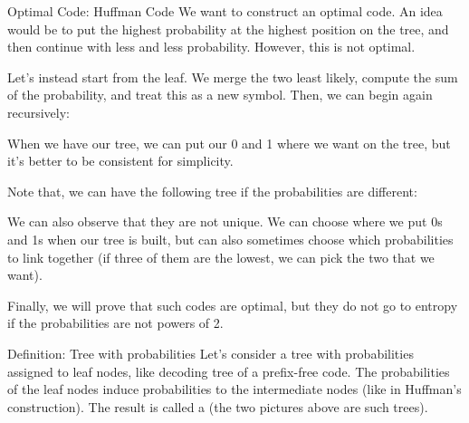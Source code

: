 \documentclass[a4paper]{article}
\begin{document}
\begin{parag}{Optimal Code: Huffman Code}
    We want to construct an optimal code. An idea would be to put the highest probability at the highest position on the tree, and then continue with less and less probability. However, this is not optimal.

    Let's instead start from the leaf. We merge the two least likely, compute the sum of the probability, and treat this as a new symbol. Then, we can begin again recursively:

    When we have our tree, we can put our 0 and 1 where we want on the tree, but it's better to be consistent for simplicity.

    Note that, we can have the following tree if the probabilities are different:

    We can also observe that they are not unique. We can choose where we put 0s and 1s when our tree is built, but can also sometimes choose which probabilities to link together (if three of them are the lowest, we can pick the two that we want).

    Finally, we will prove that such codes are optimal, but they do not go to entropy if the probabilities are not powers of 2.
\end{parag}

\begin{parag}{Definition: Tree with probabilities}
    Let's consider a tree with probabilities assigned to leaf nodes, like decoding tree of a prefix-free code. The probabilities of the leaf nodes induce probabilities to the intermediate nodes (like in Huffman's construction). The result is called a  (the two pictures above are such trees).
\end{parag}
\end{document}
